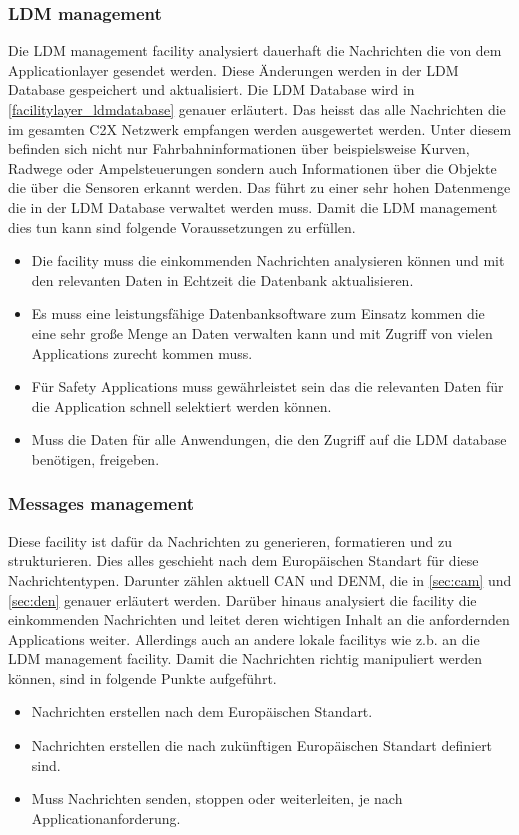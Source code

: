 \subsubsection{LDM management \label{facilitylayer_LDMManagement}}
Die LDM management facility analysiert dauerhaft die Nachrichten die von dem Applicationlayer gesendet werden. Diese Änderungen werden in der LDM Database gespeichert und aktualisiert. Die LDM Database wird in \autoref{facilitylayer_ldmdatabase} genauer erläutert. Das heisst das alle Nachrichten die im gesamten C2X Netzwerk empfangen werden ausgewertet werden. Unter diesem befinden sich nicht nur Fahrbahninformationen über beispielsweise Kurven, Radwege oder Ampelsteuerungen sondern auch Informationen über die Objekte die über die Sensoren erkannt werden. Das führt zu einer sehr hohen Datenmenge die in der LDM Database verwaltet werden muss. Damit die LDM management dies tun kann sind folgende Voraussetzungen zu erfüllen.
\begin{itemize}
\item Die facility muss die einkommenden Nachrichten analysieren können und mit den relevanten Daten in Echtzeit die Datenbank aktualisieren.
\item Es muss eine leistungsfähige Datenbanksoftware zum Einsatz kommen die eine sehr große Menge an Daten verwalten kann und mit Zugriff von vielen Applications zurecht kommen muss.
\item Für Safety Applications muss gewährleistet sein das die relevanten Daten für die Application schnell selektiert werden können.
\item Muss die Daten für alle Anwendungen, die den Zugriff auf die LDM database benötigen, freigeben.
\end{itemize}

\subsubsection{Messages management \label{facilitylayer_MessagesManagement}}
Diese facility ist dafür da Nachrichten zu generieren, formatieren und zu strukturieren. Dies alles geschieht nach dem Europäischen Standart für diese Nachrichtentypen. Darunter zählen aktuell CAN und DENM, die in \autoref{sec:cam} und \autoref{sec:den} genauer erläutert werden. Darüber hinaus analysiert die facility die einkommenden Nachrichten und leitet deren wichtigen Inhalt an die anfordernden Applications weiter. Allerdings auch an andere lokale facilitys wie z.b. an die LDM management facility. Damit die Nachrichten richtig manipuliert werden können, sind in \cite{etsi102638} folgende Punkte aufgeführt.
\begin{itemize}
\item Nachrichten erstellen nach dem Europäischen Standart. 
\item Nachrichten erstellen die nach zukünftigen Europäischen Standart definiert sind.
\item Muss Nachrichten senden, stoppen oder weiterleiten, je nach Applicationanforderung.
\end{itemize}

